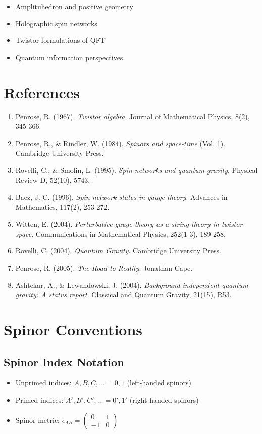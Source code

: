 \documentclass[12pt,a4paper]{article}
\theoremstyle{definition}
\begin{document}
\begin{itemize}
    \item Amplituhedron and positive geometry
    \item Holographic spin networks
    \item Twistor formulations of QFT
    \item Quantum information perspectives
\end{itemize}

\section{References}

\begin{enumerate}
    \item Penrose, R. (1967). \emph{Twistor algebra}. Journal of Mathematical Physics, 8(2), 345-366.
    \item Penrose, R., \& Rindler, W. (1984). \emph{Spinors and space-time} (Vol. 1). Cambridge University Press.
    \item Rovelli, C., \& Smolin, L. (1995). \emph{Spin networks and quantum gravity}. Physical Review D, 52(10), 5743.
    \item Baez, J. C. (1996). \emph{Spin network states in gauge theory}. Advances in Mathematics, 117(2), 253-272.
    \item Witten, E. (2004). \emph{Perturbative gauge theory as a string theory in twistor space}. Communications in Mathematical Physics, 252(1-3), 189-258.
    \item Rovelli, C. (2004). \emph{Quantum Gravity}. Cambridge University Press.
    \item Penrose, R. (2005). \emph{The Road to Reality}. Jonathan Cape.
    \item Ashtekar, A., \& Lewandowski, J. (2004). \emph{Background independent quantum gravity: A status report}. Classical and Quantum Gravity, 21(15), R53.
\end{enumerate}

\appendix

\section{Spinor Conventions}

\subsection{Spinor Index Notation}
\begin{itemize}
    \item Unprimed indices: $A, B, C, \ldots = 0, 1$ (left-handed spinors)
    \item Primed indices: $A', B', C', \ldots = 0', 1'$ (right-handed spinors)
    \item Spinor metric: $\epsilon_{AB} = \begin{pmatrix} 0 & 1 \\ -1 & 0 \end{pmatrix}$
\end{itemize}
\end{document}
